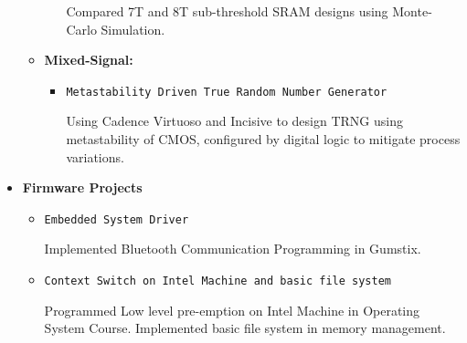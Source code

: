 \documentclass[]{article}
\begin{document}
\begin{itemize}
\begin{itemize}
\begin{itemize}
            Compared 7T and 8T sub-threshold SRAM designs using Monte-Carlo Simulation.

        \end{itemize}

        \item \textbf{Mixed-Signal:}

        \begin{itemize}
            \item \verb+Metastability Driven True Random Number Generator+

            Using Cadence Virtuoso and Incisive to design TRNG using metastability of CMOS,
            configured by digital logic to mitigate process variations.

        \end{itemize}

    \end{itemize}

    \item \textbf{Firmware Projects}

    \begin{itemize}

        \item \verb+Embedded System Driver+

        Implemented Bluetooth Communication Programming in Gumstix.

        \item \verb+Context Switch on Intel Machine and basic file system+

        Programmed Low level pre-emption on Intel Machine in Operating System
        Course. Implemented basic file system in memory management.

    \end{itemize}







\end{itemize}
\end{document}

